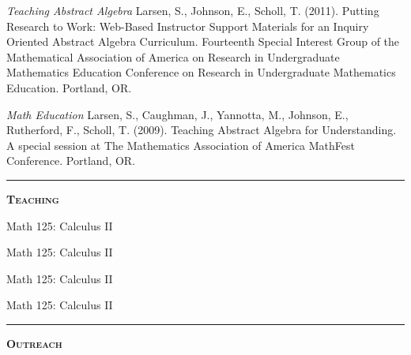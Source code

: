 \documentclass[12pt]{article}
\newcommand{\sectionheading}[1]
{
\bigskip %
\noindent
\hspace{-6.5mm}\textcolor{Gray}{\rule[.75mm]{21.5mm}{1mm}} %
\hspace{.2mm}	%
{\large{\textbf{\textsc{#1}}}} %
}
\newenvironment{date_section}
	{
	\vspace{-1ex}
	\leftmargini = 15ex
		\begin{itemize}[
			labelsep = *,
			labelwidth = 9ex,
			labelindent = 0ex,
			itemindent = !,
			font=\normalfont,
			align=parleft
		]{}
		\itemsep=-1.5mm
	}
	{\end{itemize}\vspace{-2ex}}
\newcommand{\yearmo}[2]{
	\item[
		{\makebox[1ex][r]{#1}}
		\hspace{1ex}
		{\makebox[1ex][l]{#2} }
		] }
\begin{document}
		\begin{date_section}

			\yearmo{2011}{} %
				\emph{Teaching Abstract Algebra}
				Larsen, S., Johnson, E., Scholl, T. (2011).
				Putting Research to Work: Web-Based Instructor
				Support Materials for an Inquiry Oriented
				Abstract Algebra Curriculum. Fourteenth Special
				Interest Group of the Mathematical Association
				of America on Research in Undergraduate
				Mathematics Education Conference on Research
				in Undergraduate Mathematics Education.
				Portland, OR.

			\yearmo{2009}{} %
				\emph{Math Education}
				Larsen, S., Caughman, J., Yannotta, M.,
				Johnson, E., Rutherford, F., Scholl, T.
				(2009). Teaching Abstract Algebra for
				Understanding. A special session at The
				Mathematics Association of America MathFest
				Conference. Portland, OR.

		\end{date_section}

	\sectionheading{Teaching}%

		\begin{date_section}

			\yearmo{2017}{June}%
				Math 125: Calculus II

			\yearmo{2016}{June}%
				Math 125: Calculus II

			\yearmo{2015}{June}%
				Math 125: Calculus II

			\yearmo{2014}{June}%
				Math 125: Calculus II

		\end{date_section}

	\sectionheading{Outreach}%
\end{document}

